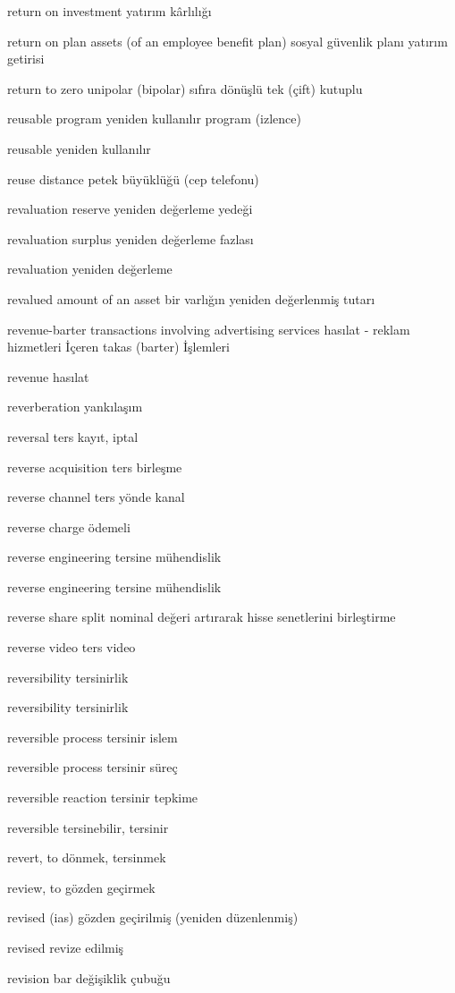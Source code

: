 \documentclass[12pt,fleqn]{article}\usepackage{../../common}
\begin{document}
return on investment yatırım kârlılığı

return on plan assets (of an employee benefit plan) sosyal güvenlik planı yatırım getirisi

return to zero unipolar (bipolar) sıfıra dönüşlü tek (çift) kutuplu

reusable program yeniden kullanılır program (izlence)

reusable yeniden kullanılır

reuse distance petek büyüklüğü (cep telefonu)

revaluation reserve yeniden değerleme yedeği

revaluation surplus yeniden değerleme fazlası

revaluation yeniden değerleme

revalued amount of an asset bir varlığın yeniden değerlenmiş tutarı

revenue-barter transactions involving advertising services hasılat - reklam hizmetleri İçeren takas (barter) İşlemleri

revenue hasılat

reverberation yankılaşım

reversal ters kayıt, iptal

reverse acquisition ters birleşme

reverse channel ters yönde kanal

reverse charge ödemeli

reverse engineering tersine mühendislik

reverse engineering tersine mühendislik

reverse share split nominal değeri artırarak hisse senetlerini birleştirme

reverse video ters video

reversibility tersinirlik

reversibility tersinirlik

reversible process tersinir islem

reversible process tersinir süreç

reversible reaction tersinir tepkime

reversible tersinebilir, tersinir

revert, to dönmek, tersinmek

review, to gözden geçirmek

revised (ias) gözden geçirilmiş (yeniden düzenlenmiş)

revised revize edilmiş

revision bar değişiklik çubuğu
\end{document}
